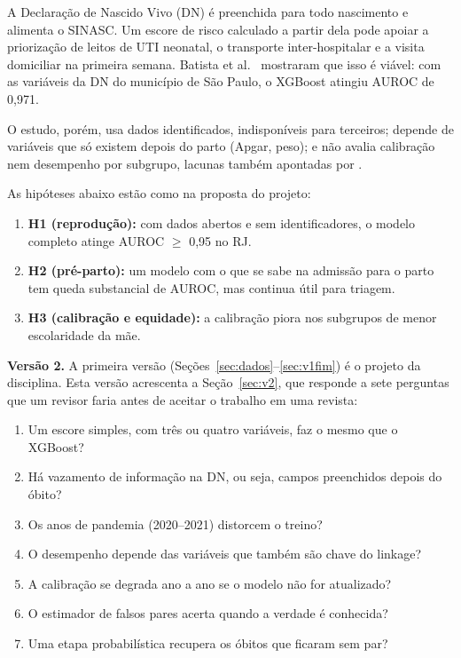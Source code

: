 \documentclass[12pt]{article}
\begin{document}
A Declaração de Nascido Vivo (DN) é preenchida para todo nascimento e alimenta o SINASC. Um escore de risco calculado a partir dela pode apoiar a priorização de leitos de UTI neonatal, o transporte inter-hospitalar e a visita domiciliar na primeira semana. Batista et al.~\cite{batista2021} mostraram que isso é viável: com as variáveis da DN do município de São Paulo, o XGBoost atingiu AUROC de 0,971.

O estudo, porém, usa dados identificados, indisponíveis para terceiros; depende de variáveis que só existem depois do parto (Apgar, peso); e não avalia calibração nem desempenho por subgrupo, lacunas também apontadas por \cite{mangold2021}.

As hipóteses abaixo estão como na proposta do projeto:
\begin{enumerate}
  \item \textbf{H1 (reprodução):} com dados abertos e sem identificadores, o modelo completo atinge AUROC $\geq$ 0,95 no RJ.
  \item \textbf{H2 (pré-parto):} um modelo com o que se sabe na admissão para o parto tem queda substancial de AUROC, mas continua útil para triagem.
  \item \textbf{H3 (calibração e equidade):} a calibração piora nos subgrupos de menor escolaridade da mãe.
\end{enumerate}

\textbf{Versão 2.} A primeira versão (Seções~\ref{sec:dados}--\ref{sec:v1fim}) é o projeto da disciplina. Esta versão acrescenta a Seção~\ref{sec:v2}, que responde a sete perguntas que um revisor faria antes de aceitar o trabalho em uma revista:
\begin{enumerate}[label=\textbf{Q\arabic*.}]
  \item Um escore simples, com três ou quatro variáveis, faz o mesmo que o XGBoost?
  \item Há vazamento de informação na DN, ou seja, campos preenchidos depois do óbito?
  \item Os anos de pandemia (2020--2021) distorcem o treino?
  \item O desempenho depende das variáveis que também são chave do linkage?
  \item A calibração se degrada ano a ano se o modelo não for atualizado?
  \item O estimador de falsos pares acerta quando a verdade é conhecida?
  \item Uma etapa probabilística recupera os óbitos que ficaram sem par?
\end{enumerate}
\end{document}
